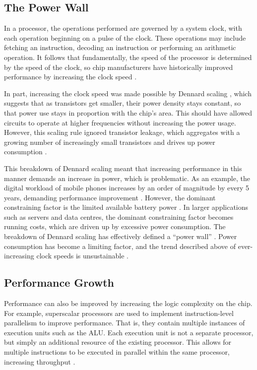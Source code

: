 \documentclass[bsc,frontabs,singlespacing,parskip,deptreport]{infthesis}
\begin{document}
\subsection{The Power Wall} \label{the-power-wall}
In a processor, the operations performed are governed by a system clock, with each operation beginning on a pulse of the clock. These operations may include fetching an instruction, decoding an instruction or performing an arithmetic operation. It follows that fundamentally, the speed of the processor is determined by the speed of the clock, so chip manufacturers have historically improved performance by increasing the clock speed \cite{stallings}.

In part, increasing the clock speed was made possible by Dennard scaling \cite{dennard_1999}, which suggests that as transistors get smaller, their power density stays constant, so that power use stays in proportion with the chip's area. This should have allowed circuits to operate at higher frequencies without increasing the power usage. However, this scaling rule ignored transistor leakage, which aggregates with a growing number of increasingly small transistors and drives up power consumption \cite{bohr_2007}.

This breakdown of Dennard scaling meant that increasing performance in this manner demands an increase in power, which is problematic. As an example, the digital workload of mobile phones increases by an order of magnitude by every 5 years, demanding performance improvement \cite{berkel_2009}. However, the dominant constraining factor is the limited available battery power \cite{berkel_2009}. In larger applications such as servers and data centres, the dominant constraining factor becomes running costs, which are driven up by excessive power consumption. The breakdown of Dennard scaling has effectively defined a “power wall” \cite{patterson-hennessy}. Power consumption has become a limiting factor, and the trend described above of ever-increasing clock speeds is unsustainable \cite{blake_2009}.

\subsection{Performance Growth} \label{performance-growth}
Performance can also be improved by increasing the logic complexity on the chip. For example, superscalar processors are used to implement instruction-level parallelism to improve performance. That is, they contain multiple instances of execution units such as the ALU. Each execution unit is not a separate processor, but simply an additional resource of the existing processor. This allows for multiple instructions to be executed in parallel within the same processor, increasing throughput \cite{stallings}.
\end{document}
